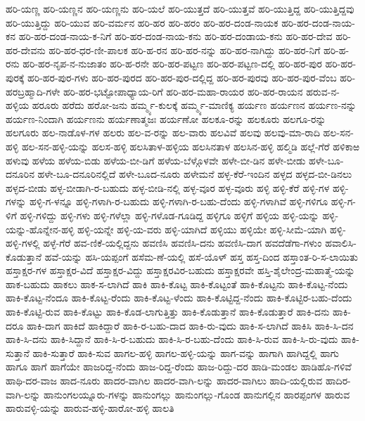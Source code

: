 {ಹರಿ-ಯಣ್ಣ
ಹರಿ-ಯಣ್ಣನ
ಹರಿ-ಯಣ್ಣನು
ಹರಿ-ಯಲೆ
ಹರಿ-ಯುತ್ತದೆ
ಹರಿ-ಯುತ್ತವೆ
ಹರಿ-ಯುತ್ತಿದ್ದ
ಹರಿ-ಯುತ್ತಿದ್ದವು
ಹರಿ-ಯುತ್ತಿದ್ದು
ಹರಿ-ಯುವ
ಹರಿ-ವರ್ಮನ
ಹರಿ-ಹರ
ಹರಿ-ಹರಂ
ಹರಿ-ಹರ-ದಂಡ-ನಾಯಕ
ಹರಿ-ಹರ-ದಂಡ-ನಾಯ-ಕನ
ಹರಿ-ಹರ-ದಂಡ-ನಾಯ-ಕ-ನಿಗೆ
ಹರಿ-ಹರ-ದಂಡ-ನಾಯ-ಕನು
ಹರಿ-ಹರ-ದಂಡಾಯ-ಕನು
ಹರಿ-ಹರ-ದೇವ
ಹರಿ-ಹರ-ದೇವನು
ಹರಿ-ಹರ-ಧರ-ಣೀ-ಪಾಲಕ
ಹರಿ-ಹ-ರನ
ಹರಿ-ಹರ-ನನ್ನು
ಹರಿ-ಹರ-ನಾಗಿದ್ದು
ಹರಿ-ಹರ-ನಿಗೆ
ಹರಿ-ಹ-ರನು
ಹರಿ-ಹರ-ನೃಪ-ನ-ನುಜಾತಂ
ಹರಿ-ಹ-ರನೇ
ಹರಿ-ಹರ-ಪಟ್ಟಣ
ಹರಿ-ಹರ-ಪಟ್ಟಣ-ದಲ್ಲಿ
ಹರಿ-ಹರ-ಪುರ
ಹರಿ-ಹರ-ಪುರಕ್ಕೆ
ಹರಿ-ಹರ-ಪುರ-ಗಳು
ಹರಿ-ಹರ-ಪುರದ
ಹರಿ-ಹರ-ಪುರ-ದಲ್ಲಿದ್ದ
ಹರಿ-ಹರ-ಪುರವು
ಹರಿ-ಹರ-ಪುರ-ವೆಂಬ
ಹರಿ-ಹರಬ್ರಹ್ಮಾದಿ-ಗಳೇ
ಹರಿ-ಹರ-ಭಟ್ಟೋಪಾಧ್ಯಾಯ-ರಿಗೆ
ಹರಿ-ಹರ-ಮಹಾ-ರಾಯರ
ಹರಿ-ಹರ-ರಾಯನ
ಹರುವ-ನ-ಹಳ್ಳಿಯ
ಹರೂರು
ಹರೆದು
ಹರೋ-ಜನು
ಹರ್ಮ್ಮ್ಯ-ಕುಲಕ್ಕೆ
ಹರ್ಮ್ಮ್ಯ-ಮಾಣಿಕ್ಯ
ಹರ್ಯಣ
ಹರ್ಯಣನ
ಹರ್ಯಣ-ನನ್ನು
ಹರ್ಯಣ-ನಿಂದಾಗಿ
ಹರ್ಯಣನು
ಹರ್ಯಣಾತ್ಮಜಃ
ಹರ್ಯಣೋ
ಹಲಕೂ-ರನ್ನು
ಹಲಕೂರು
ಹಲಗೂ-ರನ್ನು
ಹಲಗೂರು
ಹಲ-ನಾಡೊಳ-ಗಳ
ಹಲರು
ಹಲ-ವ-ರನ್ನು
ಹಲ-ವಾರು
ಹಲವಿವೆ
ಹಲವು
ಹಲವು-ಮಾ-ರಾದಿ
ಹಲ-ಸನ-ಹಳ್ಳಿ
ಹಲ-ಸನ-ಹಳ್ಳಿ-ಯನ್ನು
ಹಲಸ-ಹಳ್ಳಿ
ಹಲಸಿತಾಳ-ಹಳ್ಳಿಯ
ಹಲಸಿನತಾಳ
ಹಲಸಿನ-ಹಳ್ಳಿ
ಹಲ್ಮಿಡಿ
ಹಲ್ಲೆ-ಗೆರೆ
ಹಳಿಕಾಱ
ಹಳುವು
ಹಳೆಯ
ಹಳೆಯ-ಬಿಡು
ಹಳೆಯ-ಬೀ-ಡಿಗೆ
ಹಳೆಯ-ಬೆಳ್ಗೊಳವೇ
ಹಳೇ-ಬೀ-ಡಿನ
ಹಳೇ-ಬೀಡು
ಹಳೇ-ಬೂ-ದನೂರಿನ
ಹಳೇ-ಬೂ-ದನೂರಿನಲ್ಲಿದೆ
ಹಳೇ-ಬೂದ-ನೂರು
ಹಳೇಮನೆ
ಹಳ್ಳ-ಕೆರೆ-ಇಂದಿನ
ಹಳ್ಳದ
ಹಳ್ಳದ-ಬೀ-ಡಿನಲು
ಹಳ್ಳದ-ಬೀಡು
ಹಳ್ಳ-ಬೀಡಾಗಿ-ರ-ಬಹುದು
ಹಳ್ಳ-ಬೀಡಿ-ನಲ್ಲಿ
ಹಳ್ಳ-ವೂರ
ಹಳ್ಳ-ವೂರು
ಹಳ್ಳಿ
ಹಳ್ಳಿ-ಕೆರೆ
ಹಳ್ಳಿ-ಗಳ
ಹಳ್ಳಿ-ಗಳನ್ನು
ಹಳ್ಳಿ-ಗ-ಳನ್ನೂ
ಹಳ್ಳಿ-ಗಳಾಗಿ-ರ-ಬಹುದು
ಹಳ್ಳಿ-ಗಳಾಗಿ-ರ-ಬಹು-ದೆಂದು
ಹಳ್ಳಿ-ಗಳಾಗಿವೆ
ಹಳ್ಳಿ-ಗಳಿಗೂ
ಹಳ್ಳಿ-ಗ-ಳಿಗೆ
ಹಳ್ಳಿ-ಗಳಿದ್ದು
ಹಳ್ಳಿ-ಗಳು
ಹಳ್ಳಿ-ಗಳೆಲ್ಲಾ
ಹಳ್ಳಿ-ಗಳೊಡ-ಗೂಡಿದ್ದ
ಹಳ್ಳಿಗೂ
ಹಳ್ಳಿಗೆ
ಹಳ್ಳಿಯ
ಹಳ್ಳಿ-ಯನ್ನು
ಹಳ್ಳಿ-ಯನ್ನು-ಹೊನ್ನೇನ-ಹಳ್ಳಿ
ಹಳ್ಳಿ-ಯನ್ನೇ
ಹಳ್ಳಿ-ಯ-ವರು
ಹಳ್ಳಿ-ಯಾಗಿದೆ
ಹಳ್ಳಿಯು
ಹಳ್ಳಿಯೇ
ಹಳ್ಳಿ-ಸೀಮೆ-ಯಾಗಿ
ಹಳ್ಳಿ-ಹಳ್ಳಿ-ಗಳಲ್ಲಿ
ಹಳ್ಳೆ-ಗೆರೆ
ಹವ-ಣಿಕೆ-ಯಲ್ಲಿದ್ದನು
ಹವಣಿಸಿ
ಹವಣಿಸಿ-ದನು
ಹವಣಿಸಿ-ದಾಗ
ಹವದೆಡೆಗಾ-ಗಳುಂ
ಹವಾಲಿಸಿ-ಕೊಡುತ್ತಾನೆ
ಹವೆ-ಯನ್ನು
ಹಸಿ-ಯಪ್ಪಂಗೆ
ಹಸೆಮ-ಣೆ-ಯಲ್ಲಿ
ಹಸೆ-ಯೊಳ್
ಹಸ್ತ
ಹಸ್ತ-ದಿಂದ
ಹಸ್ತಾಂತ-ರಿ-ಸ-ಲಾಯಿತು
ಹಸ್ತಾಕ್ಷರ-ಗಳ
ಹಸ್ತಾಕ್ಷರ-ವಿದೆ
ಹಸ್ತಾಕ್ಷರ-ವಿದ್ದು
ಹಸ್ತಾಕ್ಷರವಿರ-ಬಹುದು
ಹಸ್ತಾಕ್ಷರವೇ
ಹಸ್ತಿ-ಶೈಲೇಂದ್ರ-ಮಹಾತ್ಮೆ-ಯನ್ನು
ಹಾಕ-ಬಹುದು
ಹಾಕಲು
ಹಾಕ-ಸ-ಲಾಗಿದೆ
ಹಾಕಿ
ಹಾಕಿ-ಕೊಟ್ಟ
ಹಾಕಿ-ಕೊಟ್ಟಂತೆ
ಹಾಕಿ-ಕೊಟ್ಟನು
ಹಾಕಿ-ಕೊಟ್ಟ-ನೆಂದು
ಹಾಕಿ-ಕೊಟ್ಟ-ನೆಂದೂ
ಹಾಕಿ-ಕೊಟ್ಟ-ರೆಂದು
ಹಾಕಿ-ಕೊಟ್ಟ-ಳೆಂದು
ಹಾಕಿ-ಕೊಟ್ಟಿದ್ದ-ನೆಂದು
ಹಾಕಿ-ಕೊಟ್ಟಿರ-ಬಹು-ದೆಂದು
ಹಾಕಿ-ಕೊಟ್ಟಿ-ರುವ
ಹಾಕಿ-ಕೊಟ್ಟು
ಹಾಕಿ-ಕೊಡ-ಲಾಗುತ್ತಿತ್ತು
ಹಾಕಿ-ಕೊಡುತ್ತಾನೆ
ಹಾಕಿ-ಕೊಡುತ್ತಾರೆ
ಹಾಕಿ-ದನು
ಹಾಕಿ-ದರೂ
ಹಾಕಿ-ದಾಗ
ಹಾಕಿದೆ
ಹಾಕಿದ್ದಾರೆ
ಹಾಕಿ-ರ-ಬಹು-ದಾದ
ಹಾಕಿ-ರು-ವುದು
ಹಾಕಿ-ಸ-ಲಾಗಿದೆ
ಹಾಕಿಸಿ
ಹಾಕಿ-ಸಿ-ದನ
ಹಾಕಿ-ಸಿ-ದನು
ಹಾಕಿ-ಸಿದ್ದಾನೆ
ಹಾಕಿ-ಸಿ-ರ-ಬಹುದು
ಹಾಕಿ-ಸಿ-ರ-ಬಹು-ದೆಂದು
ಹಾಕಿ-ಸಿ-ರುವ
ಹಾಕಿ-ಸಿ-ರು-ವುದು
ಹಾಕಿ-ಸುತ್ತಾನೆ
ಹಾಕಿ-ಸುತ್ತಾರೆ
ಹಾಕಿ-ಸುವ
ಹಾಗಲ-ಹಳ್ಳಿ
ಹಾಗಲ-ಹಳ್ಳಿ-ಯನ್ನು
ಹಾಗ-ವನ್ನು
ಹಾಗಾಗಿ
ಹಾಗಿದ್ದಲ್ಲಿ
ಹಾಗು
ಹಾಗೂ
ಹಾಗೆ
ಹಾಗೆಯೇ
ಹಾಜರಿದ್ದ-ನೆಂದು
ಹಾಜ-ರಿದ್ದ-ರೆಂದು
ಹಾಜ-ರಿದ್ದು-ದರ
ಹಾಡಿ-ಮಂಡಲ
ಹಾಡಿಹೊ-ಗಳಿವೆ
ಹಾಥಿ-ದರ-ವಾಜ
ಹಾದ-ನೂರು
ಹಾದರ-ವಾಗಿಲ
ಹಾದರ-ವಾಗಿ-ಲನ್ನು
ಹಾದರ-ವಾಗಿಲು
ಹಾದಿ-ಯಲ್ಲಿರುವ
ಹಾದಿರ-ವಾಗಿ-ಲನ್ನು
ಹಾನುಂಗಲಯ್ನೂರು-ಗಳನ್ನು
ಹಾನುಂಗಲ್ಲು
ಹಾನುಂಗಲ್ಲು-ಗೊಂಡ
ಹಾನುಗಲ್ಲಿನ
ಹಾರಪ್ಪಂಗಳ
ಹಾರುವ
ಹಾರುವಳ್ಳಿ-ಯನ್ನು
ಹಾರುವ-ಹಳ್ಳಿ-ಹಾರೋ-ಹಳ್ಳಿ
ಹಾಲತಿ
}
